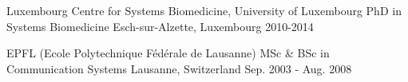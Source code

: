 

\begin{cventries}

  \cventry
    {Luxembourg Centre for Systems Biomedicine, University of Luxembourg} %
    {PhD in Systems Biomedicine} %
    {Esch-sur-Alzette, Luxembourg} %
    {2010-2014} %
    {}

  \cventry
  {EPFL (Ecole Polytechnique Fédérale de Lausanne)} %
  {MSc \& BSc in Communication Systems} %
  {Lausanne, Switzerland} %
  {Sep. 2003 - Aug. 2008} %
  {
  }

 
\end{cventries}
